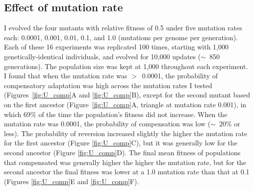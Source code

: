 \begin{doublespace}
\subsection{Effect of mutation rate}

I evolved the four mutants with relative fitness of 0.5
under five mutation rates each: 0.0001, 0.001, 0.01, 0.1, and 1.0
(mutations per genome per generation).
%
Each of these 16 experiments was replicated 100 times,
starting with 1,000 genetically-identical individuals,
and evolved for 10,000 updates ($\sim$~850 generations).
%
The population size was kept at 1,000 throughout each experiment.
%
I found that when the mutation rate was $>$~0.0001,
the probability of compensatory adaptation
was high across the mutation rates I tested
(Figures~\ref{fig:U_comp}A and \ref{fig:U_comp}B),
except for the second mutant based on the first ancestor
(Figure~\ref{fig:U_comp}A, triangle at mutation rate 0.001),
in which 69\% of the time the population's fitness did not increase.
%
When the mutation rate was 0.0001, the probability of compensation
was low ($\sim$~20\% or less).
%
The probability of reversion increased slightly
the higher the mutation rate for the first ancestor (Figure \ref{fig:U_comp}C),
but it was generally low for the second ancestor (Figure \ref{fig:U_comp}D).
%
The final mean fitness of populations that compensated
was generally higher the higher the mutation rate,
but for the second ancestor the final fitness was lower
at a 1.0 mutation rate than that at 0.1
(Figures \ref{fig:U_comp}E and \ref{fig:U_comp}F).




\end{doublespace}

